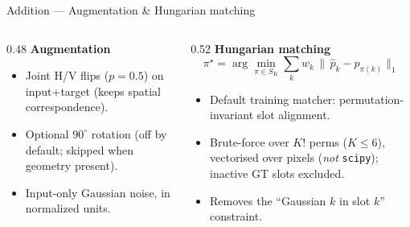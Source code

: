 \documentclass[aspectratio=169,10pt]{beamer}
\begin{document}
\begin{frame}{Addition --- Augmentation \& Hungarian matching}
  \begin{columns}[T]
    \begin{column}{0.48\textwidth}
      \small\textbf{Augmentation}
      \begin{itemize}\scriptsize
        \item Joint H/V flips ($p=0.5$) on input+target (keeps spatial correspondence).
        \item Optional $90^\circ$ rotation (off by default; skipped when geometry present).
        \item Input-only Gaussian noise, in normalized units.
      \end{itemize}
      \vspace{2pt}
      \centering
    \end{column}
    \begin{column}{0.52\textwidth}
      \small\textbf{Hungarian matching}
      \[
        \pi^\star=\arg\min_{\pi\in S_K}\sum_{k} w_k\,\big\|\,\hat p_k - p_{\pi(k)}\big\|_1
      \]
      \begin{itemize}\scriptsize
        \item Default training matcher: permutation-invariant slot alignment.
        \item Brute-force over $K!$ perms ($K\!\le\!6$), vectorised over pixels
              (\emph{not} \texttt{scipy}); inactive GT slots excluded.
        \item Removes the ``Gaussian $k$ in slot $k$'' constraint.
      \end{itemize}
    \end{column}
  \end{columns}
\end{frame}
\end{document}
